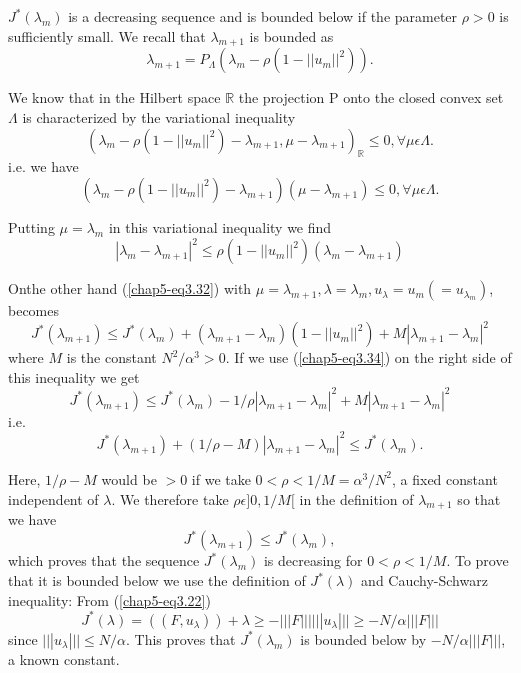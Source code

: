 \begin{step}\label{chap5-step1}
 $J^{*} (\lambda_{m})$ is a decreasing sequence and is bounded below if the parameter $\rho > 0$ is sufficiently small. We recall that $\lambda_{m+1}$ is bounded as
$$
\lambda_{m+1} = P_{\Lambda}(\lambda_{m} - \rho(1 - ||u_{m}||^{2})).
$$

We know that in the Hilbert space $\mathbb{R}$ the projection P onto the closed convex set $\Lambda$ is characterized by the variational inequality
$$
(\lambda_{m} - \rho(1 - ||u_{m}||^{2}) -\lambda_{m+1}, \mu - \lambda_{m+1})_{\mathbb{R}} \leq 0, \forall \mu  \epsilon \Lambda.
$$
i.e. we have
\begin{equation*}
(\lambda_{m} - \rho(1 - ||u_{m}||^{2})-\lambda_{m+1}) (\mu - \lambda_{m+1}) \leq 0, \forall \mu \epsilon \Lambda.\tag{3.33}\label{chap5-eq3.33}
\end{equation*}

Putting $\mu = \lambda_{m}$ in this variational inequality we find
\begin{equation*}
|\lambda_{m} - \lambda_{m+1}|^{2} \leq \rho(1 - ||u_{m}||^{2}) (\lambda_{m} - \lambda_{m+1})\tag{3.34}\label{chap5-eq3.34}
\end{equation*}

On\pageoriginale the other hand (\ref{chap5-eq3.32}) with $\mu = \lambda_{m+1}, \lambda = \lambda_{m}, u_{\lambda} = u_{m}( = u_{\lambda_{m}})$, becomes
$$
J^{*} (\lambda_{m+1}) \leq J^{*} (\lambda_{m}) + (\lambda_{m+1} - \lambda_{m})(1 - ||u_{m}||^{2}) + M |\lambda_{m+1} - \lambda_{m}|^{2}
$$
where $M$ is the constant $N^{2} / \alpha^{3} > 0$. If we use (\ref{chap5-eq3.34}) on the right side of this inequality we get
$$
J^{*} (\lambda_{m+1}) \leq J^{*} (\lambda_{m}) - 1/\rho |\lambda_{m+1} - \lambda_{m}|^{2} + M|\lambda_{m+1} - \lambda_{m}|^{2}
$$
i.e.
\begin{equation*}
J^{*} (\lambda_{m+1}) + (1/\rho - M) |\lambda_{m+1} - \lambda_{m}|^{2} \leq J^{*}(\lambda_{m}).\tag{3.35}\label{chap5-eq3.35}
\end{equation*}

Here, $1/\rho - M$ would be $> 0$ if we take $0 < \rho < 1/M = \alpha^{3} / N^{2}$, a fixed constant independent of $\lambda$. We therefore take $\rho \epsilon ]0, 1/M[$ in the definition of $\lambda_{m+1}$ so that we have
$$
J^{*} (\lambda_{m+1}) \leq J^{*} (\lambda_{m}),
$$
which proves that the sequence $J^{*}(\lambda_{m})$ is decreasing for $0 < \rho < 1/M$. To prove that it is bounded below we use the definition of $J^{*}(\lambda)$ and Cauchy-Schwarz inequality: From (\ref{chap5-eq3.22})
$$
J^{*} (\lambda) = ((F, u_{\lambda})) + \lambda \geq - |||F||| |||u_{\lambda}||| \geq - N/ \alpha |||F|||
$$
since $|||u_{\lambda}||| \leq N / \alpha$. This proves that $J^{*}(\lambda_{m})$ is bounded below by $-N/\alpha |||F|||$, a known constant.
\end{step}

